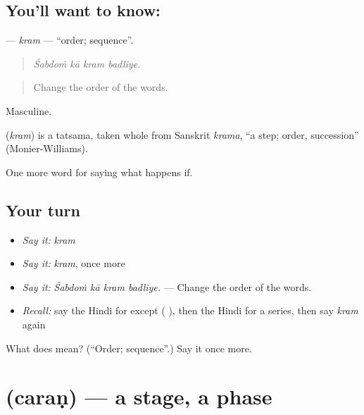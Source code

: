 \subsection*{You'll want to know: }
\textbf{} — \emph{kram} — \textquotedblleft{}order; sequence\textquotedblright{}.

\begin{quote}
   
\end{quote}

\begin{quote}
\emph{Śabdoṁ kā kram badliye.}
\end{quote}

\begin{quote}
Change the order of the words.
\end{quote}

Masculine.

\begin{cousinweb}
\textbf{} (\emph{kram}) is a tatsama, taken whole from Sanskrit \emph{krama}, \textquotedblleft{}a step; order, succession\textquotedblright{} (Monier-Williams).
\end{cousinweb}

\begin{grammarlens}[title={What you've built}]
One more word for saying what happens if.
\end{grammarlens}

\subsection*{Your turn}
\begin{itemize}
\raggedright
  \item \emph{Say it:} \emph{kram}
  \item \emph{Say it:} \emph{kram}, once more
  \item \emph{Say it:} \emph{Śabdoṁ kā kram badliye.} — Change the order of the words.
  \item \emph{Recall:} say the Hindi for except ( ), then the Hindi for a series, then say \emph{kram} again
\end{itemize}

\begin{tcolorbox}[breakable,colback=teal!4,colframe=teal!35!black,title={Before you move on}]
What does  mean? (\textquotedblleft{}Order; sequence\textquotedblright{}.) Say it once more.
\end{tcolorbox}
\section[\texorpdfstring{\hi{चरण} (caraṇ)}{चरण (caraṇ)}]{ (caraṇ) — a stage, a phase}

